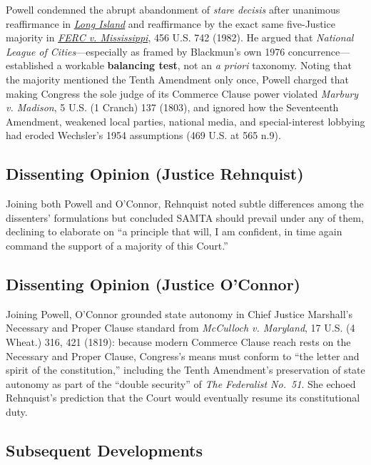 \documentclass[12pt]{article}
\begin{document}
Powell condemned the abrupt abandonment of \textit{stare decisis} after unanimous reaffirmance in \href{https://supreme.justia.com/cases/federal/us/455/678/}{\textit{Long Island}} and reaffirmance by the exact same five-Justice majority in \href{https://supreme.justia.com/cases/federal/us/456/742/}{\textit{FERC v. Mississippi}}, 456 U.S. 742 (1982). He argued that \textit{National League of Cities}---especially as framed by Blackmun's own 1976 concurrence---established a workable \textbf{balancing test}, not an \textit{a priori} taxonomy. Noting that the majority mentioned the Tenth Amendment only once, Powell charged that making Congress the sole judge of its Commerce Clause power violated \textit{Marbury v. Madison}, 5 U.S. (1 Cranch) 137 (1803), and ignored how the Seventeenth Amendment, weakened local parties, national media, and special-interest lobbying had eroded Wechsler's 1954 assumptions (469 U.S. at 565 n.9).

\subsection{Dissenting Opinion (Justice Rehnquist)}

Joining both Powell and O'Connor, Rehnquist noted subtle differences among the dissenters' formulations but concluded SAMTA should prevail under any of them, declining to elaborate on ``a principle that will, I am confident, in time again command the support of a majority of this Court.''

\subsection{Dissenting Opinion (Justice O'Connor)}

Joining Powell, O'Connor grounded state autonomy in Chief Justice Marshall's Necessary and Proper Clause standard from \textit{McCulloch v. Maryland}, 17 U.S. (4 Wheat.) 316, 421 (1819): because modern Commerce Clause reach rests on the Necessary and Proper Clause, Congress's means must conform to ``the letter and spirit of the constitution,'' including the Tenth Amendment's preservation of state autonomy as part of the ``double security'' of \textit{The Federalist No.~51}. She echoed Rehnquist's prediction that the Court would eventually resume its constitutional duty.

\subsection{Subsequent Developments}
\end{document}
